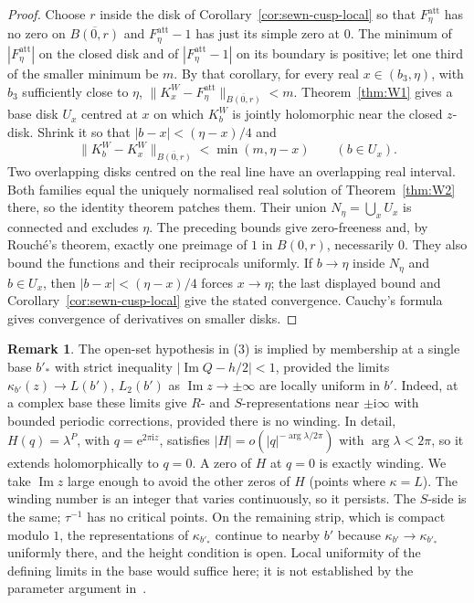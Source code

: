 \documentclass[11pt]{amsart}
\theoremstyle{definition}
\newtheorem{remark}[theorem]{Remark}
\newcommand{\Rr}{R}
\newcommand{\Kk}{K}
\newcommand{\eee}{\mathrm{e}}
\newcommand{\ii}{\mathrm{i}}
\begin{document}
\begin{proof}
Choose $r$ inside the disk of Corollary~\ref{cor:sewn-cusp-local}
so that $F_\eta^{\mathrm{att}}$ has no zero on $\overline{B(0,r)}$
and $F_\eta^{\mathrm{att}}-1$ has just its simple zero at $0$.
The minimum of $|F_\eta^{\mathrm{att}}|$ on the closed disk and of
$|F_\eta^{\mathrm{att}}-1|$ on its boundary is positive; let one third
of the smaller minimum be $m$.  By that corollary, for every real
$x\in(b_3,\eta)$, with $b_3$ sufficiently close to $\eta$,
$\|\Kk_x^W-F_\eta^{\mathrm{att}}\|_{\overline{B(0,r)}}<m$.
Theorem~\ref{thm:W1} gives a base disk $U_x$ centred at $x$ on which
$\Kk_b^W$ is jointly holomorphic near the closed $z$-disk.  Shrink it
so that $|b-x|<(\eta-x)/4$ and
\[
 \|\Kk_b^W-\Kk_x^W\|_{\overline{B(0,r)}}
 <\min(m,\eta-x)\qquad(b\in U_x).
\]
Two overlapping disks centred on the real line have an overlapping real
interval.  Both families equal the uniquely normalised real solution of
Theorem~\ref{thm:W2} there, so the identity theorem patches them.
Their union $N_\eta=\bigcup_x U_x$ is connected and excludes $\eta$.
The preceding bounds give zero-freeness and, by Rouch\'e's theorem,
exactly one preimage of $1$ in $B(0,r)$, necessarily $0$.
They also bound the functions and their reciprocals uniformly.
If $b\to\eta$ inside $N_\eta$ and $b\in U_x$, then
$|b-x|<(\eta-x)/4$ forces $x\to\eta$; the last displayed bound and
Corollary~\ref{cor:sewn-cusp-local} give the stated convergence.
Cauchy's formula gives convergence of derivatives on smaller disks.
\end{proof}

\begin{remark}\label{rem:open}
The open-set hypothesis in (3) is implied by membership at a single base
$b'_*$ with strict inequality $|\operatorname{Im}Q-h/2|<1$, provided the limits $\kappa_{b'}(z)\to L(b')$, $L_2(b')$ as
$\operatorname{Im}z\to\pm\infty$ are locally uniform in $b'$.  Indeed, at a
complex base these limits give $\Rr$- and $S$-representations near
$\pm\ii\infty$ with bounded periodic corrections, provided there is no winding.
In detail, $H(q)=\lambda^{P}$, with $q=\eee^{2\pi\ii z}$, satisfies
$|H|=o(|q|^{-\arg\lambda/2\pi})$ with $\arg\lambda<2\pi$, so it extends
holomorphically to $q=0$.  A zero of $H$ at $q=0$ is exactly winding.  We take
$\operatorname{Im}z$ large enough to avoid the other zeros of $H$ (points where
$\kappa=L$).  The winding number is an integer that varies continuously, so it
persists.  The $S$-side is the same; $\tau^{-1}$ has no critical points.
On the remaining strip, which is compact modulo $1$, the representations of
$\kappa_{b'_*}$ continue to nearby $b'$ because $\kappa_{b'}\to\kappa_{b'_*}$
uniformly there, and the height condition is open.  Local uniformity of the
defining limits in the base would suffice here; it is not established by the
parameter argument in~\cite[Prop.~3 and \S5]{Paulsen2019}.
\end{remark}
\end{document}
